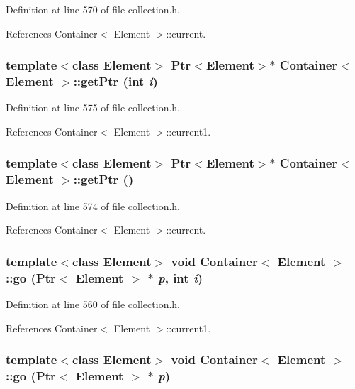 Definition at line 570 of file collection.h.

References Container$<$ Element $>$::current.\hypertarget{classContainer_fbc047571e5612343d92794004a947ae}{
\subsubsection[{getPtr}]{\setlength{\rightskip}{0pt plus 5cm}template$<$class Element$>$ {\bf Ptr}$<$Element$>$$\ast$ {\bf Container}$<$ Element $>$::getPtr (int {\em i})}}
\label{classContainer_fbc047571e5612343d92794004a947ae}




Definition at line 575 of file collection.h.

References Container$<$ Element $>$::current1.\hypertarget{classContainer_542e2401c60213071a387ab65fd49814}{
\subsubsection[{getPtr}]{\setlength{\rightskip}{0pt plus 5cm}template$<$class Element$>$ {\bf Ptr}$<$Element$>$$\ast$ {\bf Container}$<$ Element $>$::getPtr ()}}
\label{classContainer_542e2401c60213071a387ab65fd49814}




Definition at line 574 of file collection.h.

References Container$<$ Element $>$::current.\hypertarget{classContainer_0887069d98e5231010e5ceaff6a46682}{
\subsubsection[{go}]{\setlength{\rightskip}{0pt plus 5cm}template$<$class Element$>$ void {\bf Container}$<$ Element $>$::go ({\bf Ptr}$<$ Element $>$ $\ast$ {\em p}, \/  int {\em i})}}
\label{classContainer_0887069d98e5231010e5ceaff6a46682}




Definition at line 560 of file collection.h.

References Container$<$ Element $>$::current1.\hypertarget{classContainer_569092a3dec9b9a0dc300d4b421742c4}{
\subsubsection[{go}]{\setlength{\rightskip}{0pt plus 5cm}template$<$class Element$>$ void {\bf Container}$<$ Element $>$::go ({\bf Ptr}$<$ Element $>$ $\ast$ {\em p})}}
\label{classContainer_569092a3dec9b9a0dc300d4b421742c4}




